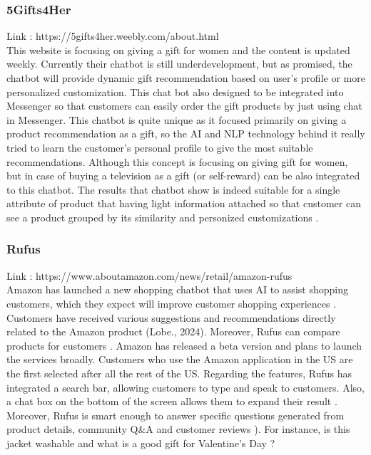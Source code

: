 \documentclass[12pt,a4paper]{article}
\begin{document}
\subsubsection{5Gifts4Her} 
\noindent Link : https://5gifts4her.weebly.com/about.html\\
\noindent This website is focusing on giving a gift for women and the content is updated weekly. Currently their chatbot is still underdevelopment, but as promised, the chatbot will provide dynamic gift recommendation based on user’s profile or more personalized customization. This chat bot also designed to be integrated into Messenger so that customers can easily order the gift products by just using chat in Messenger. This chatbot is quite unique as it focused primarily on giving a product recommendation as a gift, so the AI and NLP technology behind it really tried to learn the customer’s personal profile to give the most suitable recommendations. Although this concept is focusing on giving gift for women, but in case of buying a television as a gift (or self-reward) can be also integrated to this chatbot. The results that chatbot show is indeed suitable for a single attribute of product that having light information attached so that customer can see a product grouped by its similarity and personized customizations \citep{question_3.2}.\\









\subsubsection{Rufus } 
\noindent Link : https://www.aboutamazon.com/news/retail/amazon-rufus \\
\noindent Amazon has launched a new shopping chatbot that uses AI to assist shopping customers, which they expect will improve customer shopping experiences \citep{question_3.3}. Customers have received various suggestions and recommendations directly related to the Amazon product (Lobe., 2024). Moreover, Rufus can compare products for customers \citep{question_3.3}. Amazon has released a beta version and plans to launch the services broadly. Customers who use the Amazon application in the US are the first selected after all the rest of the US. Regarding the features, Rufus has integrated a search bar, allowing customers to type and speak to customers. Also, a chat box on the bottom of the screen allows them to expand their result \citep{question_3.3}. Moreover, Rufus is smart enough to answer specific questions generated from product details, community Q\&A and customer reviews \citep{question_3.3}). For instance, is this jacket washable and what is a good gift for Valentine's Day \citep{question_3.4}?\\
\end{document}
